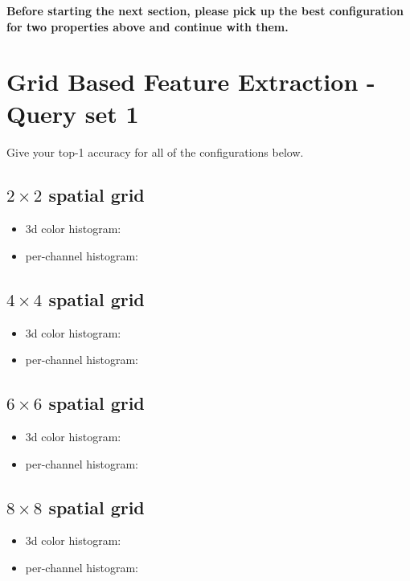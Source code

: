 \documentclass[12pt]{article}
\begin{document}
\newpage
\textbf{Before starting the next section, please pick up the best configuration for two properties above and continue with them.}

\section{Grid Based Feature Extraction - Query set 1}
Give your top-1 accuracy for all of the configurations below.

\subsection{$2 \times 2$ spatial grid}
\begin{itemize}
\item 3d color histogram:
\item per-channel histogram:
\end{itemize}

\subsection{$4 \times 4$ spatial grid}
\begin{itemize}
\item 3d color histogram:
\item per-channel histogram:
\end{itemize}

\subsection{$6 \times 6$ spatial grid}
\begin{itemize}
\item 3d color histogram:
\item per-channel histogram:
\end{itemize}

\subsection{$8 \times 8$ spatial grid}
\begin{itemize}
\item 3d color histogram:
\item per-channel histogram:
\end{itemize}
\end{document}
